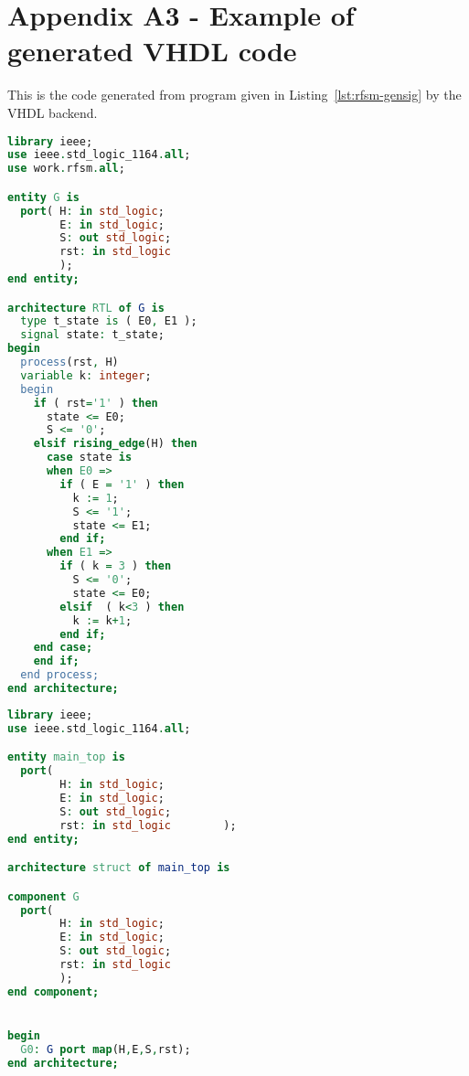 \chapter*{Appendix A3 - Example of generated VHDL code}  
\label{cha:ex1-vhdl}

This is the code generated from program given in Listing~\ref{lst:rfsm-gensig} by the VHDL backend.

\begin{lstlisting}[language=VHDL,frame=single,numbers=none,basicstyle=\small,caption=File g.vhd]
library ieee;
use ieee.std_logic_1164.all;
use work.rfsm.all;

entity G is
  port( H: in std_logic;
        E: in std_logic;
        S: out std_logic;
        rst: in std_logic
        );
end entity;

architecture RTL of G is
  type t_state is ( E0, E1 );
  signal state: t_state;
begin
  process(rst, H)
  variable k: integer;
  begin
    if ( rst='1' ) then
      state <= E0;
      S <= '0';
    elsif rising_edge(H) then 
      case state is
      when E0 =>
        if ( E = '1' ) then
          k := 1;
          S <= '1';
          state <= E1;
        end if;
      when E1 =>
        if ( k = 3 ) then
          S <= '0';
          state <= E0;
        elsif  ( k<3 ) then
          k := k+1;
        end if;
    end case;
    end if;
  end process;
end architecture;

\end{lstlisting}

\begin{lstlisting}[language=VHDL,frame=single,numbers=none,basicstyle=\small,caption=File main_top.vhd]
library ieee;
use ieee.std_logic_1164.all;	   

entity main_top is
  port(
        H: in std_logic;
        E: in std_logic;
        S: out std_logic;
        rst: in std_logic        );
end entity;

architecture struct of main_top is

component G 
  port(
        H: in std_logic;
        E: in std_logic;
        S: out std_logic;
        rst: in std_logic
        );
end component;


begin
  G0: G port map(H,E,S,rst);
end architecture;
\end{lstlisting}

